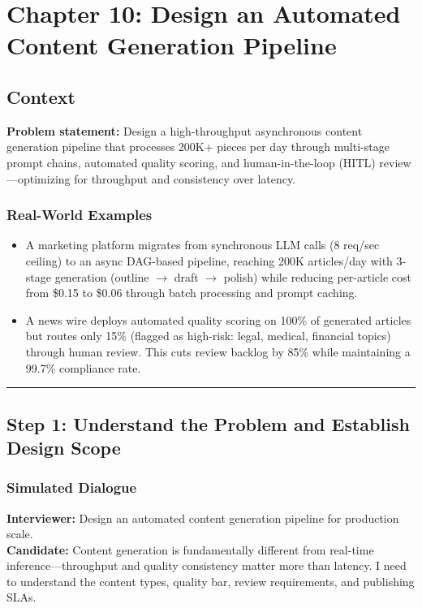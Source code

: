 \chapter{Chapter 10: Design an Automated Content Generation Pipeline}

\section*{Context}

\textbf{Problem statement:} Design a high-throughput asynchronous content generation pipeline that processes 200K+ pieces per day through multi-stage prompt chains, automated quality scoring, and human-in-the-loop (HITL) review---optimizing for throughput and consistency over latency.

\subsection*{Real-World Examples}

\begin{itemize}
  \item A marketing platform migrates from synchronous LLM calls (8 req/sec ceiling) to an async DAG-based pipeline, reaching 200K articles/day with 3-stage generation (outline $\rightarrow$ draft $\rightarrow$ polish) while reducing per-article cost from \$0.15 to \$0.06 through batch processing and prompt caching.
  \item A news wire deploys automated quality scoring on 100\% of generated articles but routes only 15\% (flagged as high-risk: legal, medical, financial topics) through human review. This cuts review backlog by 85\% while maintaining a 99.7\% compliance rate.
\end{itemize}

\bigskip\hrule\bigskip

\section*{Step 1: Understand the Problem and Establish Design Scope}

\subsection*{Simulated Dialogue}

\textbf{Interviewer:} Design an automated content generation pipeline for production scale.\\
\textbf{Candidate:} Content generation is fundamentally different from real-time inference---throughput and quality consistency matter more than latency. I need to understand the content types, quality bar, review requirements, and publishing SLAs.

